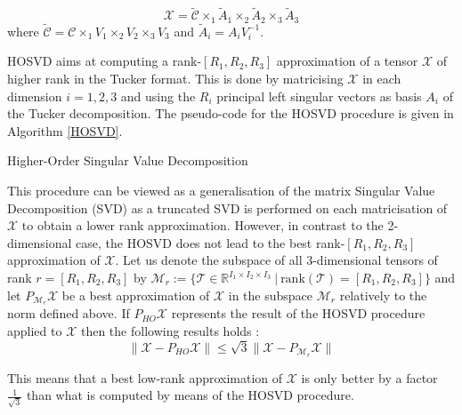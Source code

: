 \documentclass[a4paper, 11pt]{article} %
\makeatletter
\def \be {\begin{equation*}}
\def \ee {\end{equation*}}
\def \X {\mathcal{X}}
\def \R {\mathbb{R}}
\def \t {\times}
\def \rank{\mbox{rank}}
\def \C {\mathcal{C}}
\def \Mr {\mathcal{M}_{r}}
\def\BState{\State\hskip-\ALG@thistlm}
\makeatother
\begin{document}
\be
\X=\tilde{\C} \t_1 \tilde{A}_1 \t_2 \tilde{A}_2 \t_3 \tilde{A}_3 
\ee
where $\tilde{\C}=\C\t_1V_1 \t_2 V_2 \t_3 V_3$ and $\tilde{A}_i=A_iV_i^{-1}$.

HOSVD aims at computing a rank-$\left[R_1,R_2, R_3\right]$ approximation of a tensor $\X$ of higher rank in the Tucker format. This is done by matricising $\X$ in each dimension $i=1,2,3$ and using the $R_i$ principal left singular vectors as basis $A_i$ of the Tucker decomposition. The pseudo-code for the HOSVD procedure is given in Algorithm \autoref{HOSVD}.

\begin{algorithm}
\caption{Higher-Order Singular Value Decomposition}\label{HOSVD}
\end{algorithm}


This procedure can be viewed as a generalisation of the matrix Singular Value Decomposition (SVD) as a truncated SVD is performed on each matricisation of $\X$ to obtain a lower rank approximation. However, in contrast to the 2-dimensional case, the HOSVD does not lead to the best rank-$\left[R_1,R_2, R_3\right]$ approximation of $\X$. Let us denote the subspace of  all 3-dimensional tensors of rank $r=\left[R_1, R_2, R_3\right]$  by  $\Mr:=\{  \in \R^{I_1\t I_2 \t I_3}\ |\ \rank()=\left[R_1,R_2, R_3\right] \}$ and let $P_{\Mr}\X$ be a best approximation of $\X$ in the subspace $\Mr$ relatively to the norm defined above. If $P_{HO}\X$ represents the result of the HOSVD procedure applied to $\X$ then the following results holds \cite{GeomCG}:
\be
\|\X-P_{HO}\X \|\leqslant \sqrt{3} \| \X-P_{\Mr}\X \|
\ee

This means that a best low-rank approximation of $\X$  is only better by a factor $$ than what is computed by means of the HOSVD procedure.
\end{document}
